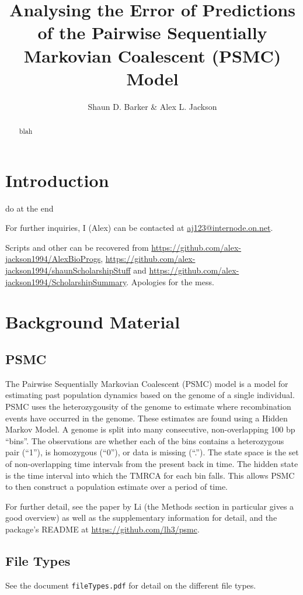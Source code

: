 \documentclass[11pt,a4paper]{article}
\title{Analysing the Error of Predictions of the Pairwise Sequentially Markovian Coalescent (PSMC) Model}
\author{Shaun D. Barker & Alex L. Jackson}
\begin{document}
\maketitle

\begin{abstract}
blah

\end{abstract}
\section{Introduction}
do at the end

For further inquiries, I (Alex) can be contacted at \href{mailto:aj123@internode.on.net}{aj123@internode.on.net}.

Scripts and other can be recovered from \url{https://github.com/alex-jackson1994/AlexBioProgs}, \url{https://github.com/alex-jackson1994/shaunScholarshipStuff} and \url{https://github.com/alex-jackson1994/ScholarshipSummary}. Apologies for the mess.

\section{Background Material}
\subsection{PSMC}
The Pairwise Sequentially Markovian Coalescent (PSMC) model \cite{li2011inference} is a model for estimating past population dynamics based on the  genome of a single individual. PSMC uses the heterozygousity of the genome to estimate where recombination events have occurred in the genome. These estimates are found using a Hidden Markov Model. A genome is split into many consecutive, non-overlapping 100 bp ``bins''. The observations are whether each of the bins contains a heterozygous pair (``1''), is homozygous (``0''), or data is missing (``.''). The state space is the set of non-overlapping time intervals from the present back in time. The hidden state is the time interval into which the TMRCA for each bin falls. This allows PSMC to then construct a population estimate over a period of time. 

For further detail, see the paper by Li \cite{li2011inference} (the Methods section in particular gives a good overview) as well as the supplementary information for detail, and the package's README at \url{https://github.com/lh3/psmc}.

\subsection{File Types}
See the document \verb|fileTypes.pdf| for detail on the different file types.
\end{document}
